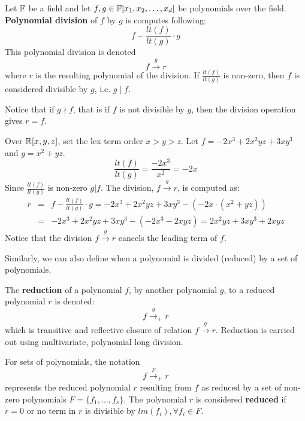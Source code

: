 \begin{Definition}
Let ${\mathbb{F}}$ be a field and let $f, g \in {\mathbb{F}}[x_1, x_2, \ldots, x_d]$ be polynomials
over the field. {\bf Polynomial division} of $f$ by $g$ is computes following:
\begin{equation}
f-\frac{lt(f)}{lt(g)}\cdot g
\end{equation}
This polynomial division is denoted
\begin{equation}
f\xrightarrow{g} r
\end{equation}
where $r$ is the resulting polynomial of the division.
If $\frac{lt(f)}{lt(g)}$ is non-zero, then $f$ is considered divisible by $g$, 
i.e. $g \mid f$.
\end{Definition}
Notice that if $g \nmid f$, that is if $f$ is not divisible by $g$,
then the division operation gives $r = f$.
\begin{Example}
Over ${\mathbb{R}}[x,y,z]$, set the lex term order $x > y > z$.
Let $f = -2x^3 + 2x^2yz + 3xy^3$ and $g = x^2+yz$.
\begin{equation}
\frac{lt(f)}{lt(g)} = \frac{-2x^3}{x^2} = -2x
\end{equation}
Since $\frac{lt(f)}{lt(g)}$ is non-zero $g|f$. The division, $f\xrightarrow{g} r$, 
is computed as:
\begin{eqnarray}
r &=& f-\frac{lt(f)}{lt(g)}\cdot g = -2x^3 + 2x^2yz + 3xy^3 - (-2x \cdot (x^2+yz)) \nonumber \\
&=& -2x^3 + 2x^2yz + 3xy^3 - (-2x^3-2xyz) = 2x^2yz + 3xy^3 + 2xyz
\end{eqnarray}
Notice that the division $f\stackrel{g}{\textstyle\longrightarrow}r$ cancels the leading term of $f$.
\end{Example}

Similarly, we can also define when a polynomial is divided (reduced) by a set of polynomials.
\begin{Definition}
    The {\bf reduction} of a polynomial $f$, by another polynomial $g$, to
    a reduced polynomial $r$ is denoted:
    \begin{equation*}
        f\stackrel{g}{\textstyle\longrightarrow}_{+}r
    \end{equation*}
    which is transitive and reflective closure of relation $f\stackrel{g}{\textstyle\longrightarrow}r$. 
    Reduction is carried out using multivariate, polynomial long division. 
  
    For sets of polynomials, the notation 
    \begin{equation*}
    f\stackrel{F}{\textstyle\longrightarrow}_+r    
    \end{equation*}
    represents the reduced polynomial $r$ resulting from $f$ as reduced by a 
    set of non-zero polynomials $F = \{f_1,\dots,f_s\}$.  The polynomial $r$ is considered {\bf reduced} if 
    $r = 0$  or no term in $r$ is divisible  by $lm(f_i), \forall f_i \in F$.
\end{Definition}

